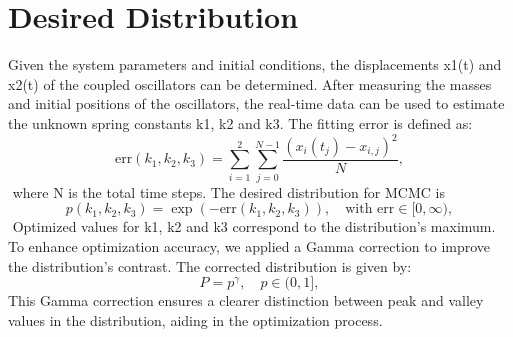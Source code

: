 \documentclass[12pt, a4paper]{article}%
\begin{document}
\section{Desired Distribution}
Given the system parameters and initial conditions, the displacements x1(t) and x2(t) of the coupled oscillators can be determined. After measuring the masses and initial positions of the oscillators, the real-time data can be used to estimate the unknown spring constants k1, k2 and k3. The fitting error is defined as: 	\begin{equation}
	\mathrm{err}\left(k_1,k_2,k_3\right) = \sum_{i=1}^{2}\sum_{j=0}^{N-1}\frac{\left(x_i\left(t_j\right) - x_{i,j}\right)^2}{N},
	\end{equation} where N is the total time steps. The desired distribution for MCMC is 	\begin{equation}
	p\left(k_1,k_2,k_3\right) = \exp\left(-\text{err}\left(k_1,k_2,k_3\right)\right), \quad \text{with }\mathrm{err}\in [0,\infty),
	\end{equation} Optimized values for k1, k2 and k3 correspond to the distribution's maximum. To enhance optimization accuracy, we applied a Gamma correction to improve the distribution's contrast. The corrected distribution is given by: 
	\begin{equation}
	P = p^{\gamma},\quad p\in (0,1],
	\end{equation}
This Gamma correction ensures a clearer distinction between peak and valley values in the distribution, aiding in the optimization process.

\end{document}
